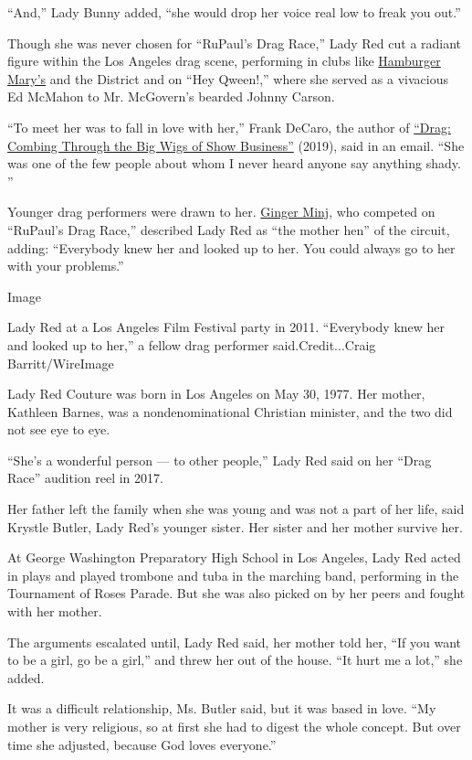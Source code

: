 ``And,'' Lady Bunny added, ``she would drop her voice real low to freak
you out.''

Though she was never chosen for ``RuPaul's Drag Race,'' Lady Red cut a
radiant figure within the Los Angeles drag scene, performing in clubs
like \href{https://www.hamburgermarys.com/weho/}{Hamburger Mary's} and
the District and on ``Hey Qween!,'' where she served as a vivacious Ed
McMahon to Mr. McGovern's bearded Johnny Carson.

``To meet her was to fall in love with her,'' Frank DeCaro, the author
of
\href{https://www.hollywoodreporter.com/news/frank-decaro-unravels-drags-origins-new-book-1208975}{``Drag:
Combing Through the Big Wigs of Show Business''} (2019), said in an
email. ``She was one of the few people about whom I never heard anyone
say anything shady. ''

Younger drag performers were drawn to her.
\href{https://gingerminj.com/}{Ginger Minj}, who competed on ``RuPaul's
Drag Race,'' described Lady Red as ``the mother hen'' of the circuit,
adding: ``Everybody knew her and looked up to her. You could always go
to her with your problems.''

Image

Lady Red at a Los Angeles Film Festival party in 2011. ``Everybody knew
her and looked up to her,'' a fellow drag performer said.Credit...Craig
Barritt/WireImage

Lady Red Couture was born in Los Angeles on May 30, 1977. Her mother,
Kathleen Barnes, was a nondenominational Christian minister, and the two
did not see eye to eye.

``She's a wonderful person --- to other people,'' Lady Red said on her
``Drag Race'' audition reel in 2017.

Her father left the family when she was young and was not a part of her
life, said Krystle Butler, Lady Red's younger sister. Her sister and her
mother survive her.

At George Washington Preparatory High School in Los Angeles, Lady Red
acted in plays and played trombone and tuba in the marching band,
performing in the Tournament of Roses Parade. But she was also picked on
by her peers and fought with her mother.

The arguments escalated until, Lady Red said, her mother told her, ``If
you want to be a girl, go be a girl,'' and threw her out of the house.
``It hurt me a lot,'' she added.

It was a difficult relationship, Ms. Butler said, but it was based in
love. ``My mother is very religious, so at first she had to digest the
whole concept. But over time she adjusted, because God loves everyone.''

